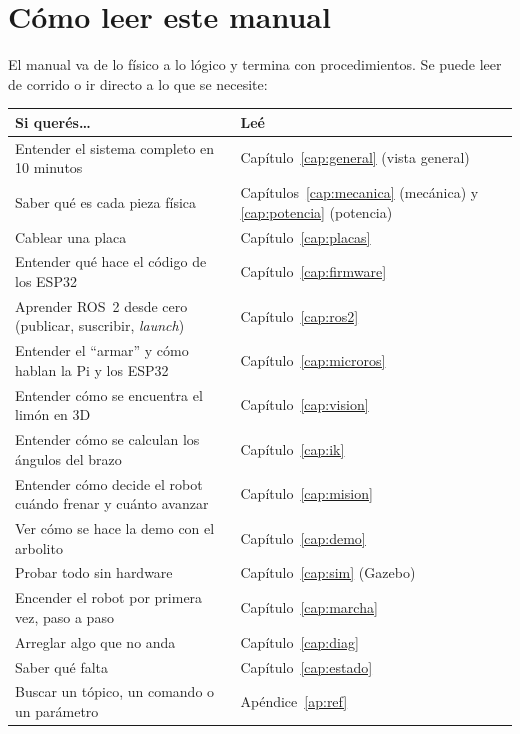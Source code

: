 \section{Cómo leer este manual}

El manual va de lo físico a lo lógico y termina con procedimientos. Se puede leer de corrido o ir directo a lo que
se necesite:

\begin{center}
\begin{tabularx}{\textwidth}{@{}l X@{}}
\toprule
\textbf{Si querés\ldots} & \textbf{Leé} \\
\midrule
Entender el sistema completo en 10 minutos & Capítulo~\ref{cap:general} (vista general) \\
Saber qué es cada pieza física & Capítulos~\ref{cap:mecanica} (mecánica) y \ref{cap:potencia} (potencia) \\
Cablear una placa & Capítulo~\ref{cap:placas} \\
Entender qué hace el código de los ESP32 & Capítulo~\ref{cap:firmware} \\
Aprender ROS~2 desde cero (publicar, suscribir, \textit{launch}) & Capítulo~\ref{cap:ros2} \\
Entender el ``armar'' y cómo hablan la Pi y los ESP32 & Capítulo~\ref{cap:microros} \\
Entender cómo se encuentra el limón en 3D & Capítulo~\ref{cap:vision} \\
Entender cómo se calculan los ángulos del brazo & Capítulo~\ref{cap:ik} \\
Entender cómo decide el robot cuándo frenar y cuánto avanzar & Capítulo~\ref{cap:mision} \\
Ver cómo se hace la demo con el arbolito & Capítulo~\ref{cap:demo} \\
Probar todo sin hardware & Capítulo~\ref{cap:sim} (Gazebo) \\
Encender el robot por primera vez, paso a paso & Capítulo~\ref{cap:marcha} \\
Arreglar algo que no anda & Capítulo~\ref{cap:diag} \\
Saber qué falta & Capítulo~\ref{cap:estado} \\
Buscar un tópico, un comando o un parámetro & Apéndice~\ref{ap:ref} \\
\bottomrule
\end{tabularx}
\end{center}

